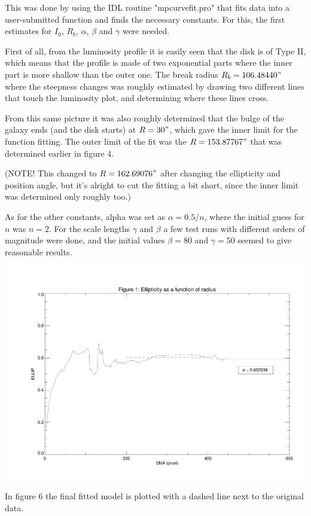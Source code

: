 \documentclass[a4paper,12pt]{article}
\begin{document}
This was done by using the IDL routine "mpcurvefit.pro" that fits data into a user-submitted function and finds the necessary constants.
For this, the first estimates for $I_0$, $R_b$, $\alpha$, $\beta$ and $\gamma$ were needed. 

First of all, from the luminosity profile it is easily seen that the disk is of Type II, which means that the profile is made of two exponential parts where the inner part is more shallow than the outer one.
The break radius $R_b=106.48440"$ where the steepness changes was roughly estimated by drawing two different lines that touch the luminosity plot, and determining where these lines cross.

From this same picture it was also roughly determined that the bulge of the galaxy ends (and the disk starts) at $R=30"$, which gave the inner limit for the function fitting. The outer limit of the fit was the $R=153.87767"$ that was determined earlier in figure 4. 

(NOTE! This changed to $R=162.69076"$ after changing the ellipticity and position angle, but it's alright to cut the fitting a bit short, since the inner limit was determined only roughly too.)

As for the other constants, alpha was set as $\alpha=0.5/n$, where the initial guess for $n$ was $n=2$. For the scale lengths $\gamma$ and $\beta$ a few test runs with different orders of magnitude were done, and the initial values $\beta=80$ and $\gamma=50$ seemed to give reasonable results.

\centerline{\includegraphics[scale=0.6,page=5]{ellipticity.pdf}}%

In figure 6 the final fitted model is plotted with a dashed line next to the original data.
\end{document}
